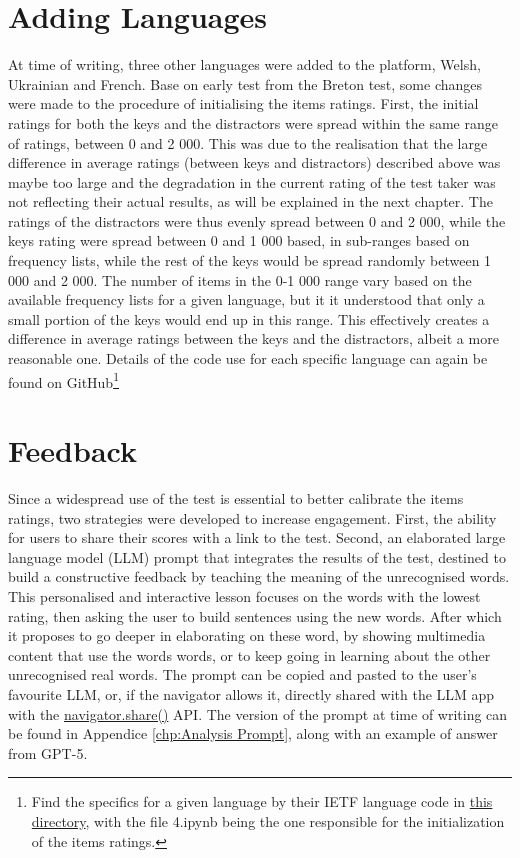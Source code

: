     \section{Adding Languages}
At time of writing, three other languages were added to the platform, Welsh, Ukrainian and French. Base on early test from the Breton test, some changes were made to the procedure of initialising the items ratings. First, the initial ratings for both the keys and the distractors were spread within the same range of ratings, between 0 and 2 000. This was due to the realisation that the large difference in average ratings (between keys and distractors) described above was maybe too large and the degradation in the current rating of the test taker was not reflecting their actual results, as will be explained in the next chapter. The ratings of the distractors were thus evenly spread between 0 and 2 000, while the keys rating were spread between 0 and 1 000 based, in sub-ranges based on frequency lists, while the rest of the keys would be spread randomly between 1 000 and 2 000. The number of items in the 0-1 000 range vary based on the available frequency lists for a given language, but it it understood that only a small portion of the keys would end up in this range. This effectively creates a difference in average ratings between the keys and the distractors, albeit a more reasonable one. Details of the code use for each specific language can again be found on GitHub\footnote{Find the specifics for a given language by their IETF language code in \href{https://github.com/Oktogazh/sudogen/tree/master/locales}{this directory}, with the file 4.ipynb being the one responsible for the initialization of the items ratings.}

    \section{Feedback}
Since a widespread use of the test is essential to better calibrate the items ratings, two strategies were developed to increase engagement. First, the ability for users to share their scores with a link to the test. Second, an elaborated large language model (LLM) prompt that integrates the results of the test, destined to build a constructive feedback by teaching the meaning of the unrecognised words. This personalised and interactive lesson focuses on the words with the lowest rating, then asking the user to build sentences using the new words. After which it proposes to go deeper in elaborating on these word, by showing multimedia content that use the words words, or to keep going in learning about the other unrecognised real words. The prompt can be copied and pasted to the user's favourite LLM, or, if the navigator allows it, directly shared with the LLM app with the \href{https://developer.mozilla.org/en-US/docs/Web/API/Navigator/share}{navigator.share()} API. The version of the prompt at time of writing can be found in Appendice \ref{chp:Analysis Prompt}, along with an example of answer from GPT-5.

